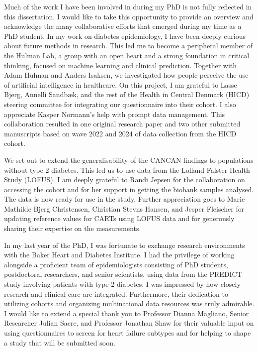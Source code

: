 \documentclass[
  letterpaper,
  headsepline=true,
  open=any]{scrbook}
\begin{document}
Much of the work I have been involved in during my PhD is not fully
reflected in this dissertation. I would like to take this opportunity to
provide an overview and acknowledge the many collaborative efforts that
emerged during my time as a PhD student. In my work on diabetes
epidemiology, I have been deeply curious about future methods in
research. This led me to become a peripheral member of the Hulman Lab, a
group with an open heart and a strong foundation in critical thinking,
focused on machine learning and clinical prediction. Together with Adam
Hulman and Anders Isaksen, we investigated how people perceive the use
of artificial intelligence in healthcare. On this project, I am grateful
to Lasse Bjerg, Annelli Sandbæk, and the rest of the Health in Central
Denmark (HICD) steering committee for integrating our questionnaire into
their cohort. I also appreciate Kasper Normann's help with prompt data
management. This collaboration resulted in one original research paper
and two other submitted manuscripts based on wave 2022 and 2024 of data
collection from the HICD cohort.

We set out to extend the generalisability of the CANCAN findings to
populations without type 2 diabetes. This led us to use data from the
Lolland-Falster Health Study (LOFUS). I am deeply grateful to Randi
Jepsen for the collaboration on accessing the cohort and for her support
in getting the biobank samples analysed. The data is now ready for use
in the study. Further appreciation goes to Marie Mathilde Bjerg
Christensen, Christian Stevns Hansen, and Jesper Fleischer for updating
reference values for CARTs using LOFUS data and for generously sharing
their expertise on the measurements.

In my last year of the PhD, I was fortunate to exchange research
environments with the Baker Heart and Diabetes Institute. I had the
privilege of working alongside a proficient team of epidemiologists
consisting of PhD students, postdoctoral researchers, and senior
scientists, using data from the PREDICT study involving patients with
type 2 diabetes. I was impressed by how closely research and clinical
care are integrated. Furthermore, their dedication to utilizing cohorts
and organizing multinational data resources was truly admirable. I would
like to extend a special thank you to Professor Dianna Magliano, Senior
Researcher Julian Sacre, and Professor Jonathan Shaw for their valuable
input on using questionnaires to screen for heart failure subtypes and
for helping to shape a study that will be submitted soon.
\end{document}
